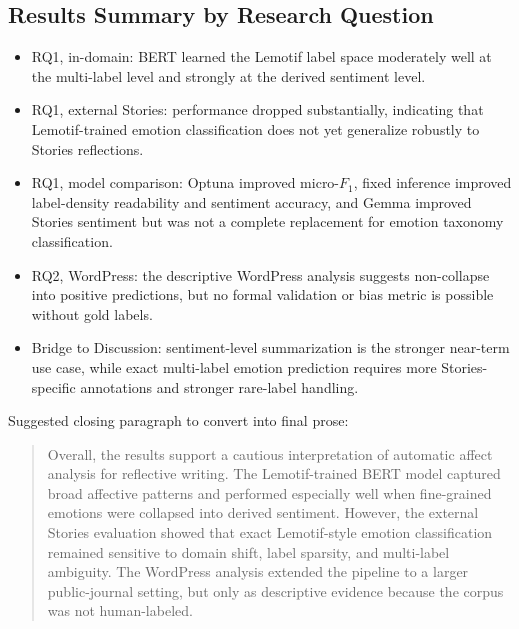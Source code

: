 \subsection{Results Summary by Research Question}
\label{subs:results-summary-rq}

\begin{itemize}
    \item RQ1, in-domain: BERT learned the Lemotif label space moderately well at the multi-label level and strongly at the derived sentiment level.
    \item RQ1, external Stories: performance dropped substantially, indicating that Lemotif-trained emotion classification does not yet generalize robustly to Stories reflections.
    \item RQ1, model comparison: Optuna improved micro-$F_1$, fixed inference improved label-density readability and sentiment accuracy, and Gemma improved Stories sentiment but was not a complete replacement for emotion taxonomy classification.
    \item RQ2, WordPress: the descriptive WordPress analysis suggests non-collapse into positive predictions, but no formal validation or bias metric is possible without gold labels.
    \item Bridge to Discussion: sentiment-level summarization is the stronger near-term use case, while exact multi-label emotion prediction requires more Stories-specific annotations and stronger rare-label handling.
\end{itemize}

Suggested closing paragraph to convert into final prose:
\begin{quote}
Overall, the results support a cautious interpretation of automatic affect analysis for reflective writing. The Lemotif-trained BERT model captured broad affective patterns and performed especially well when fine-grained emotions were collapsed into derived sentiment. However, the external Stories evaluation showed that exact Lemotif-style emotion classification remained sensitive to domain shift, label sparsity, and multi-label ambiguity. The WordPress analysis extended the pipeline to a larger public-journal setting, but only as descriptive evidence because the corpus was not human-labeled.
\end{quote}
